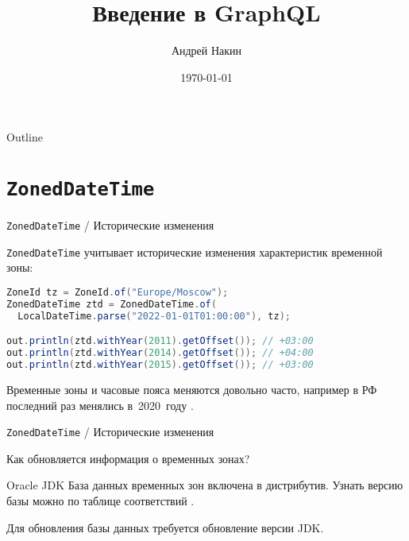 \documentclass{beamer}
\title{Введение в GraphQL}
\author{Андрей Накин}
\date{\today}
\begin{document}
\begin{frame}
    \titlepage 
\end{frame}



\begin{frame}{Outline}
    \tableofcontents
\end{frame}


\section{{\tt ZonedDateTime}}

\begin{frame}[fragile]{{\tt ZonedDateTime} / Исторические изменения}

{\tt ZonedDateTime} учитывает исторические изменения характеристик временной зоны:
\bigskip

\begin{lstlisting}[language=java]
ZoneId tz = ZoneId.of("Europe/Moscow");
ZonedDateTime ztd = ZonedDateTime.of(
  LocalDateTime.parse("2022-01-01T01:00:00"), tz);

out.println(ztd.withYear(2011).getOffset()); // +03:00
out.println(ztd.withYear(2014).getOffset()); // +04:00
out.println(ztd.withYear(2015).getOffset()); // +03:00
\end{lstlisting}

Временные зоны и часовые пояса меняются довольно часто, например в РФ последний раз менялись в~2020~году \cite{dst_news}.

\end{frame}

\begin{frame}[fragile]{{\tt ZonedDateTime} / Исторические изменения}

  Как обновляется информация о временных зонах?

  \begin{block}{Oracle JDK}
  	\bigskip База данных временных зон включена в дистрибутив. Узнать версию базы можно по таблице соответствий \cite{oracle_tzdata}. 
  	
  	Для обновления базы данных требуется обновление версии JDK.
  \end{block}

\end{frame}

\end{document}
